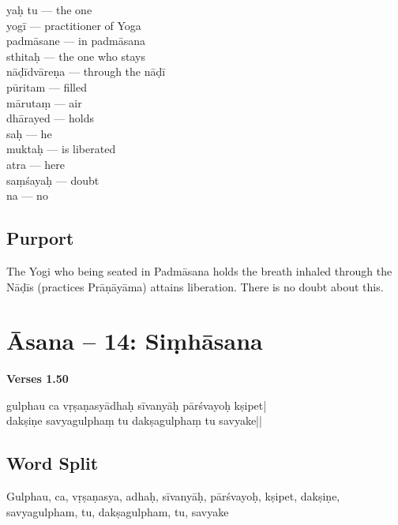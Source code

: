 \begin{multicols}{2}
yaḥ tu --- the one   \\
yogī --- practitioner of Yoga \\
padmāsane ---  in padmāsana \\
sthitaḥ --- the one who stays  \\
nāḍīdvāreṇa ---  through the nāḍī \\
pūritam --- filled  \\
mārutaṃ ---  air  \\
dhārayed ---  holds  \\
saḥ ---  he  \\
muktaḥ --- is liberated \\
atra --- here  \\
saṃśayaḥ --- doubt\\
na ---  no
\end{multicols}

\subsection*{Purport}

The Yogi who being seated in Padmāsana holds the breath inhaled through the Nāḍīs (practices Prāṇāyāma) attains liberation. There is no doubt about this.
\newpage

\section*{Āsana -- 14: Siṃhāsana}


\noindent \textbf{Verses 1.50}

\begin{shloka}
gulphau ca vṛṣaṇasyādhaḥ sīvanyāḥ pārśvayoḥ kṣipet|\\
dakṣiṇe savyagulphaṃ tu dakṣagulphaṃ tu savyake||
\end{shloka}

\subsection*{Word Split}

Gulphau, ca, vṛṣaṇasya, adhaḥ, sīvanyāḥ, pārśvayoḥ, kṣipet, dakṣiṇe, savyagulpham, tu, dakṣagulpham, tu, savyake

